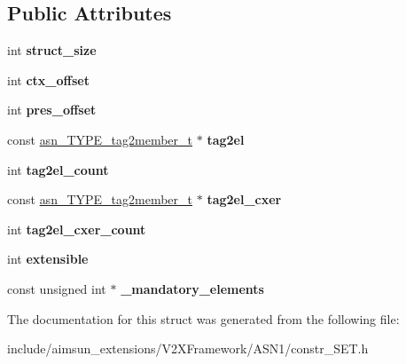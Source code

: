 \subsection*{Public Attributes}
\begin{DoxyCompactItemize}
\item 
int {\bfseries struct\+\_\+size}\hypertarget{structasn__SET__specifics__s_a7980cedae581d9a54df6e5f4cd3ace69}{}\label{structasn__SET__specifics__s_a7980cedae581d9a54df6e5f4cd3ace69}

\item 
int {\bfseries ctx\+\_\+offset}\hypertarget{structasn__SET__specifics__s_a11686de14a23286844e426092af44cdc}{}\label{structasn__SET__specifics__s_a11686de14a23286844e426092af44cdc}

\item 
int {\bfseries pres\+\_\+offset}\hypertarget{structasn__SET__specifics__s_a53ddd3d0b0fdf99a139807e7580c2247}{}\label{structasn__SET__specifics__s_a53ddd3d0b0fdf99a139807e7580c2247}

\item 
const \hyperlink{structasn__TYPE__tag2member__s}{asn\+\_\+\+T\+Y\+P\+E\+\_\+tag2member\+\_\+t} $\ast$ {\bfseries tag2el}\hypertarget{structasn__SET__specifics__s_a5cfec9d469715aa3585d135720fc0e0c}{}\label{structasn__SET__specifics__s_a5cfec9d469715aa3585d135720fc0e0c}

\item 
int {\bfseries tag2el\+\_\+count}\hypertarget{structasn__SET__specifics__s_a39f9806086eb4a6d2c1126e55eb05b81}{}\label{structasn__SET__specifics__s_a39f9806086eb4a6d2c1126e55eb05b81}

\item 
const \hyperlink{structasn__TYPE__tag2member__s}{asn\+\_\+\+T\+Y\+P\+E\+\_\+tag2member\+\_\+t} $\ast$ {\bfseries tag2el\+\_\+cxer}\hypertarget{structasn__SET__specifics__s_a01e19ad8b6ea2c0d53096744372aef9e}{}\label{structasn__SET__specifics__s_a01e19ad8b6ea2c0d53096744372aef9e}

\item 
int {\bfseries tag2el\+\_\+cxer\+\_\+count}\hypertarget{structasn__SET__specifics__s_a294e7fcfb45153ce8b776db4547303bc}{}\label{structasn__SET__specifics__s_a294e7fcfb45153ce8b776db4547303bc}

\item 
int {\bfseries extensible}\hypertarget{structasn__SET__specifics__s_aaf4f5d75a884a5a6c1dc24690a533191}{}\label{structasn__SET__specifics__s_aaf4f5d75a884a5a6c1dc24690a533191}

\item 
const unsigned int $\ast$ {\bfseries \+\_\+mandatory\+\_\+elements}\hypertarget{structasn__SET__specifics__s_a86fb45d623bde89a343eb2bda86bbf5e}{}\label{structasn__SET__specifics__s_a86fb45d623bde89a343eb2bda86bbf5e}

\end{DoxyCompactItemize}


The documentation for this struct was generated from the following file\+:\begin{DoxyCompactItemize}
\item 
include/aimsun\+\_\+extensions/\+V2\+X\+Framework/\+A\+S\+N1/constr\+\_\+\+S\+E\+T.\+h\end{DoxyCompactItemize}
